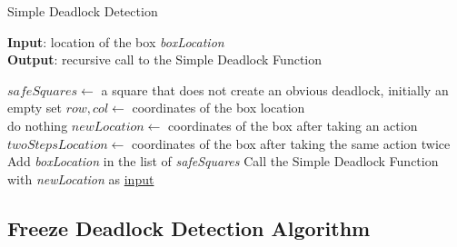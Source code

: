 \documentclass{article}
\begin{document}
\begin{algorithm}
    \caption{Simple Deadlock Detection}\label{euclid}
    \hspace*{\algorithmicindent} \textbf{Input}: location of the box \emph{boxLocation} \\
    \hspace*{\algorithmicindent} \textbf{Output}: recursive call to the Simple Deadlock Function \\
    \begin{algorithmic}
    \State $safeSquares \gets$ a square that does not create an obvious deadlock, initially an empty set
    \State $row, col \gets$ coordinates of the box location \\
        \State do nothing
    \EndIf 
        \State $newLocation \gets$ coordinates of the box after taking an action 
        \State $twoStepsLocation \gets$ coordinates of the box after taking the same action twice \\
            \State Add \emph{boxLocation} in the list of \emph{safeSquares} %
            \State Call the Simple Deadlock Function with \emph{newLocation} as \underline{input}
        \EndIf
    \EndFor
    \end{algorithmic}
\end{algorithm}

\newpage
\subsection{Freeze Deadlock Detection Algorithm}
\end{document}
